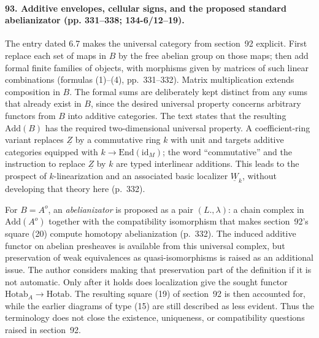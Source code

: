 \paragraph{93. Additive envelopes, cellular signs, and the proposed standard abelianizator (pp. 331--338; 134-6/12--19).}
The entry dated 6.7 makes the universal category from section~92 explicit. First replace each set of maps in $B$ by the free abelian group on those maps; then add formal finite families of objects, with morphisms given by matrices of such linear combinations (formulas (1)--(4), pp.~331--332). Matrix multiplication extends composition in $B$. The formal sums are deliberately kept distinct from any sums that already exist in $B$, since the desired universal property concerns arbitrary functors from $B$ into additive categories. The text states that the resulting $\mathrm{Add}(B)$ has the required two-dimensional universal property. A coefficient-ring variant replaces $\underline Z$ by a commutative ring $k$ with unit and targets additive categories equipped with $k\to\mathrm{End}(\mathrm{id}_M)$; the word ``commutative'' and the instruction to replace $\underline Z$ by $k$ are typed interlinear additions. This leads to the prospect of $k$-linearization and an associated basic localizer $\underline W_k$, without developing that theory here (p.~332).

For $B=A^o$, an \emph{abelianizator} is proposed as a pair $(L.,\lambda)$: a chain complex in $\mathrm{Add}(A^o)$ together with the compatibility isomorphism that makes section~92's square (20) compute homotopy abelianization (p.~332). The induced additive functor on abelian presheaves is available from this universal complex, but preservation of weak equivalences as quasi-isomorphisms is raised as an additional issue. The author considers making that preservation part of the definition if it is not automatic. Only after it holds does localization give the sought functor $\mathrm{Hotab}_A\to\mathrm{Hotab}$. The resulting square (19) of section~92 is then accounted for, while the earlier diagrams of type (15) are still described as less evident. Thus the terminology does not close the existence, uniqueness, or compatibility questions raised in section~92.

